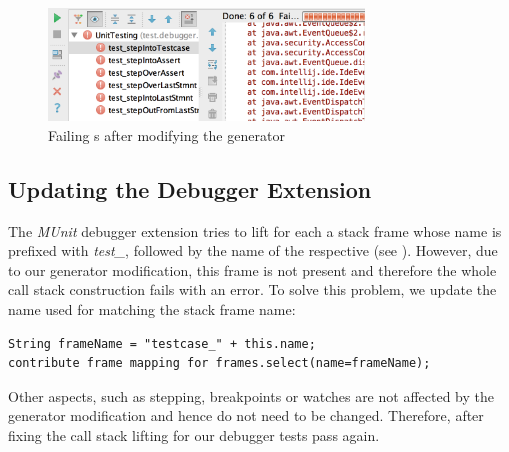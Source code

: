 \begin{figure}[h]
	\vspace{-2mm}
	\centering
    \includegraphics[width=8.4cm]{./figures/failingDebuggerTests.png} 
    \vspace{-3mm}
	\caption{Failing s after modifying the generator}
	\label{fig:TestExecution2}
	\vspace{-2mm}
\end{figure}

\subsection{Updating the Debugger Extension}

The \emph{MUnit} debugger extension tries to lift for each  a stack
frame whose name is prefixed with \emph{test\_}, followed by the name of the
respective  (see ). 
However, due to our generator modification, this
frame is not present and therefore the whole call stack construction fails with an error.
To solve this problem, we update the name used for matching the 
stack frame name:
\begin{lstlisting}[language=debuggerDSL,frame=single]
String frameName = "testcase_" + this.name;
contribute frame mapping for frames.select(name=frameName);
\end{lstlisting}

Other aspects, such as stepping, breakpoints or watches are not affected by the
generator modification and hence do not need to be changed. Therefore, after 
fixing the call stack lifting for  our debugger tests pass again.